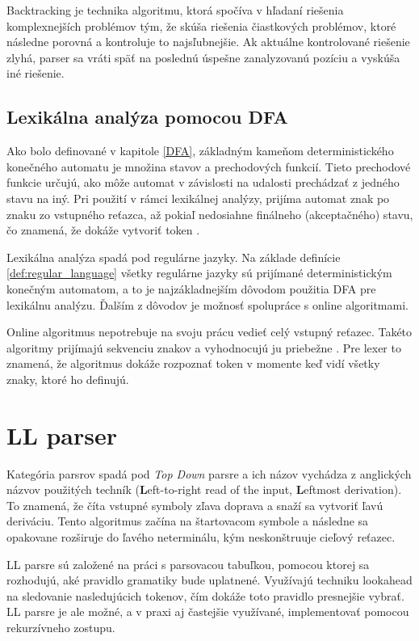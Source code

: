 Backtracking je technika algoritmu, ktorá spočíva v hľadaní riešenia komplexnejších problémov tým, že skúša riešenia čiastkových problémov, ktoré následne porovná a kontroluje to najsľubnejšie. Ak aktuálne kontrolované riešenie zlyhá, parser sa vráti späť na poslednú úspešne zanalyzovanú pozíciu a vyskúša iné riešenie.

\subsection{Lexikálna analýza pomocou DFA}
Ako bolo definované v kapitole \ref{DFA}, základným kameňom deterministického konečného automatu je množina stavov a prechodových funkcií. Tieto prechodové funkcie určujú, ako môže automat v závislosti na udalosti prechádzať z jedného stavu na iný. Pri použití v rámci lexikálnej analýzy, prijíma automat znak po znaku zo vstupného reťazca, až pokiaľ nedosiahne finálneho (akceptačného) stavu, čo znamená, že dokáže vytvoriť token \cite{roche1997finite}.

Lexikálna analýza spadá pod regulárne jazyky. Na základe definície \ref{def:regular_language} všetky regulárne jazyky sú prijímané deterministickým konečným automatom, a to je najzákladnejším dôvodom použitia DFA pre lexikálnu analýzu. Ďalším z dôvodov je možnosť spolupráce s online algoritmami.

Online algoritmus nepotrebuje na svoju prácu vedieť celý vstupný reťazec. Takéto algoritmy prijímajú sekvenciu znakov a vyhodnocujú ju priebežne \cite{karp1992line}. Pre lexer to znamená, že algoritmus dokáže rozpoznať token v momente keď vidí všetky znaky, ktoré ho definujú.

\section{LL parser}\label{LL}
Kategória  parsrov spadá pod \textit{Top Down} parsre a ich názov vychádza z anglických názvov použitých techník (\textbf{L}eft-to-right read of the input, \textbf{L}eftmost derivation). To znamená, že číta vstupné symboly zľava doprava a snaží sa vytvoriť ľavú deriváciu. Tento algoritmus začína na štartovacom symbole a následne sa opakovane rozširuje do ľavého neterminálu, kým neskonštruuje cieľový reťazec. 

LL parsre sú založené na práci s parsovacou tabuľkou, pomocou ktorej sa rozhodujú, aké pravidlo gramatiky bude uplatnené. Využívajú techniku lookahead na sledovanie nasledujúcich tokenov, čím dokáže toto pravidlo presnejšie vybrať. LL parsre je ale možné, a v praxi aj častejšie využívané, implementovať pomocou rekurzívneho zostupu.

